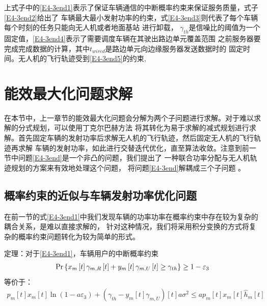 上式子中的\eqref{E4-3end1}表示了保证车辆通信的中断概率约束来保证服务质量，式子\eqref{E4-3end2}给出了
车辆最大最小发射功率的约束，式\eqref{E4-3end3}则代表了每个车辆每个时刻的任务只能向无人机或者地面基站
进行卸载，
 $\gamma_{th}$是信噪比的阈值为一个固定值，\eqref{E4-3end4}表示了需要调度车辆在其驶出路边单元覆盖范围
之前服务器要完成完成数据的计算，其中$t_{wired}$是路边单元向边缘服务器发送数据时的
固定时间。无人机的飞行轨迹受到\eqref{E4-3end5}的约束,


\section{能效最大化问题求解}\label{section4-3}
在本节中，上一章节的能效最大化问题会分解为两个子问题进行求解。对于难以求解的分式规划，可以使用丁克尔巴赫方法
将其转化为易于求解的减式规划进行求解。首先固定车辆的发射功率后求解无人机的飞行轨迹，然后固定无人机的飞行轨迹再求解
车辆的发射功率，如此进行交替迭代优化，直至算法收敛。注意到前一节中问题\eqref{E4-3end}是一个非凸的问题，我们提出了
一种联合功率分配与无人机轨迹规划的方案来有效地处理这个问题，
将问题\eqref{E4-3end}解耦成三个子问题 \cite{JointTrajectory9627548}。
\subsection{概率约束的近似与车辆发射功率优化问题}\label{section4-3-1}
在前一节的式\eqref{E4-3end1}中我们发现车辆的功率功率在概率约束中存在较为复杂的耦合关系，是难以直接求解的，
针对这种情况，我们将采用积分变换的方式将复杂的概率约束问题转化为较为简单的形式。

定理：对于\eqref{E4-3end1}，车辆用户的中断概率约束
\begin{align}
\Pr\left\{x_m\left[t\right]\gamma_{m,R}\left[t\right]+y_m\left[t\right]\gamma_{m,U}\left[t\right] \geq \gamma_{th}\right\}\geq1-\varepsilon_3    \notag
\end{align}
等价于：
\begin{equation} \label{E4-13}
\begin{gathered}
p_m\left[t\right]x_m\left[t\right]\ln \left(1-a \varepsilon_3\right)+(\gamma_{th}-y_m\left[t\right]\gamma_{m,U})\left[t\right] a \sigma^2
\leq a p_m\left[t\right]x_m\left[t\right]\hat{h}_{m}\left[t\right]
\end{gathered}
\end{equation}

